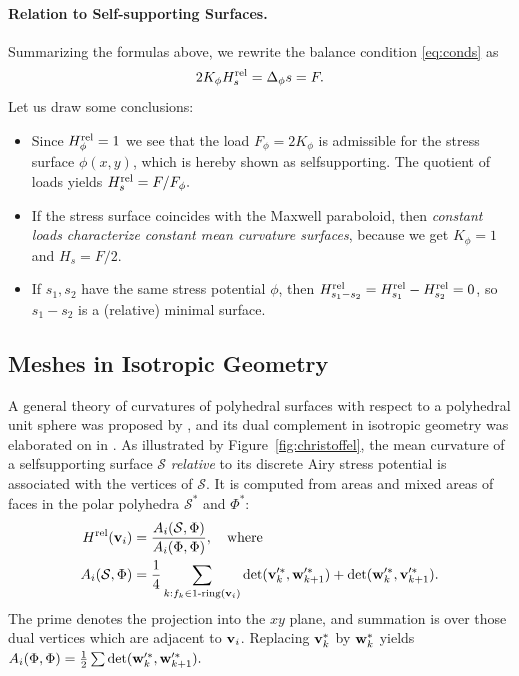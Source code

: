 \documentclass[review]{acmsiggraph}
\def\rel{{\mathord{{\rm rel}}}}
\def\SS{{\mathcal S}}
\begin{document}
\paragraph{Relation to Self-supporting Surfaces.}

Summarizing the formulas above,
we rewrite the balance condition \eqref{eq:conds} as
	\begin{equation}
	2 K_\phi H_s^\rel  = \Delta_\phi s = F.
	\label{equigeo}
	\end{equation}
 Let us draw some conclusions:

\begin{itemize}\itemsep-\parsep

\item Since $H^\rel_\phi=1$ we see that the load $F_\phi=2K_\phi$ is
admissible for the stress surface $\phi(x,y)$, which is hereby shown as
self\dash supporting. The quotient of loads yields
	$
	 H_s^\rel = F/F_\phi.
	$

\item If the stress surface coincides with the Maxwell paraboloid, then
{\em constant loads characterize constant mean curvature surfaces},
because we get $K_\phi=1$ and $H_s=F/2$.

\item If $s_1,s_2$ have the same stress potential $\phi$, then
$H^\rel_{s_1-s_2}=H^\rel_{s_1}-H^\rel_{s_2}=0$, so $s_1-s_2$ is a
(relative) minimal surface.

\end{itemize}



\subsection{Meshes in Isotropic Geometry} \label{sec:discrete}

A general theory of curvatures of polyhedral surfaces with respect to a
polyhedral unit sphere was proposed by
\cite{Pottmann2007b,bobenko-2010-ct}, and its dual complement in isotropic
geometry was elaborated on in \cite{Pottmann2007}. As illustrated by
Figure~\ref{fig:christoffel}, the mean curvature of a self\dash supporting
surface $\SS$ {\em relative} to its discrete Airy stress potential is
associated with the vertices of $\SS$. It is computed from areas and mixed
areas of faces in the polar polyhedra $\SS^*$ and $\Phi^*$:
	\begin{align*}
	H^\rel(\vw_i)
	&= {A_i(\SS,\Phi) \over A_i(\Phi,\Phi)},
	\quad\text{where}
	\\
		A_i (\SS,\Phi)
	&=
		\frac{1}{4}
		\sum_{k:f_k\in \text{1-ring}(\vw_i)}
		\det(\vw'^*_k, \ww'^*_{k+1})
		+ \det(\ww'^*_k, \vw'^*_{k+1}).
	\end{align*}
 The prime denotes the projection into the $xy$ plane, and summation is
over those dual vertices which are adjacent to ${\mathbf v}_i$.
Replacing ${\mathbf v}_k^*$ by ${\mathbf w}_k^*$ yields
	$
		A_i (\Phi,\Phi)
	=
	\frac{1}{2}
		\sum
		\det({\mathbf w}'^*_k, {\mathbf w}'^*_{k+1}).
	$
\end{document}
